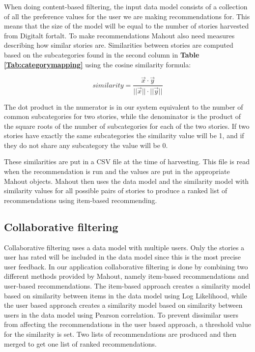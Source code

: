 When doing content-based filtering, the input data model consists of a collection of all the preference values for the user we are making recommendations for. This means that the size of the model will be equal to the number of stories harvested from Digitalt fortalt. To make recommendations Mahout also need measures describing how similar stories are. Similarities between stories are computed based on the subcategories found in the second column in \textbf{Table \ref{Tab:categorymapping}} using the cosine similarity formula: 

\begin{equation}
similarity = \frac{\vec{x}\cdot\vec{y}}{||\vec{x}||\cdot||\vec{y}||}
\end{equation}

The dot product in the numerator is in our system equivalent to the number of common subcategories for two stories, while the denominator is the product of the square roots of the number of subcategories for each of the two stories. If two stories have exactly the same subcategories the similarity value will be 1, and if they do not share any subcategory the value will be 0. \newline

These similarities are put in a CSV file at the time of harvesting. This file is read when the recommendation is run and the values are put in the appropriate Mahout objects. Mahout then uses the data model and the similarity model with similarity values for all possible pairs of stories to produce a ranked list of recommendations using item-based recommending.


\subsection{Collaborative filtering}

Collaborative filtering uses a data model with multiple users. Only the stories a user has rated will be included in the data model since this is the most precise user feedback. In our application collaborative filtering is done by combining two different methods provided by Mahout, namely item-based recommendations and user-based recommendations. The item-based approach creates a similarity model based on similarity between items in the data model using Log Likelihood, while the user based approach creates a similarity model based on similarity between users in the data model using Pearson correlation. To prevent dissimilar users from affecting the recommendations in the user based approach, a threshold value for the similarity is set. Two lists of recommendations are produced and then merged to get one list of ranked recommendations.\newline

